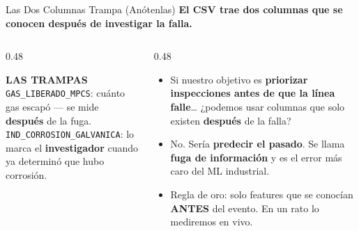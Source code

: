 \documentclass[aspectratio=169, 11pt]{beamer}
\begin{document}
\begin{frame}[shrink=8]{Las Dos Columnas Trampa (Anótenlas)}
  \vspace{-4pt}
  {\small\color{arcaDark}\bfseries
    El CSV trae dos columnas que se conocen \textbf{después} de investigar la falla.}

  \vspace{8pt}
  \begin{columns}[T]
    \begin{column}{0.48\textwidth}
      \begin{tcolorbox}[colback=arcaGray, colframe=arcaRed, boxrule=0pt, leftrule=3pt,
        arc=3pt, left=6pt, right=6pt, top=5pt, bottom=5pt]
        {\scriptsize\color{arcaRed}\bfseries\faExclamationTriangle\hspace{4pt}LAS TRAMPAS}\\[4pt]
        {\scriptsize\color{textMuted}
          \texttt{GAS\_LIBERADO\_MPCS}: cuánto gas escapó
          --- se mide \textbf{después} de la fuga.\\[3pt]
          \texttt{IND\_CORROSION\_GALVANICA}: lo marca el
          \textbf{investigador} cuando ya determinó que
          hubo corrosión.}
      \end{tcolorbox}
    \end{column}
    \begin{column}{0.48\textwidth}
      {\footnotesize\color{textMuted}
      \begin{itemize}\setlength{\itemsep}{5pt}
        \item[{\color{arcaRed}\scriptsize\faQuestion}]
          Si nuestro objetivo es \textbf{priorizar inspecciones
          antes de que la línea falle}\ldots{} ¿podemos usar
          columnas que solo existen \textbf{después} de la falla?
        \item[{\color{arcaRed}\scriptsize\faBan}]
          No. Sería \textbf{predecir el pasado}. Se llama
          \textbf{fuga de información} y es el error más caro
          del ML industrial.
        \item[{\color{codeGreen}\scriptsize\faCheck}]
          Regla de oro: solo features que se conocían
          \textbf{ANTES} del evento. En un rato lo mediremos
          en vivo.
      \end{itemize}
      }
    \end{column}
  \end{columns}
\end{frame}
\end{document}
